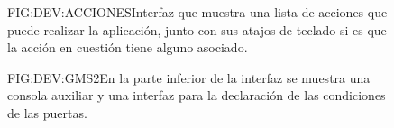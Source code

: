 \begin{figure}{FIG:DEV:ACCIONES}{Interfaz que muestra una lista de acciones que puede realizar la aplicación, junto con sus atajos de teclado si es que la acción en cuestión tiene alguno asociado.}
\end{figure}

\begin{figure}{FIG:DEV:GMS2}{En la parte inferior de la interfaz se muestra una consola auxiliar y una interfaz para la declaración de las condiciones de las puertas.}
 \quad
\end{figure}

\begin{comment}
En esta etapa se han integrado todas las componentes las unas con las otras, dejando componentes vacías que serían sustituídas en la etapa siguiente.

En la interfaz gráfica, se siguieron las maquetas planteadas, dividiendo el área de trabajo en 3 zonas, con tamaños diferentes atendiendo a su función e importancia a la hora de trabajar en el diseño.

Se construyó el sistema de los cambios de contexto mediante el uso de pestañas como elemento gráfico. Los elementos renderizados en el área que se correspondería con el canvas deben gestionar su propia renderización, aunque esta sea dentro de otra componente.

Además de la creación de la propia interfaz gráfica del usuario, se han implementado las acciones generales de la aplicación como el guardar los datos de todos los elementos en un fichero, cargar un diseño desde fichero y la creación de un nuevo diseño sin contenido sobre el que poder trabajar.

Se han proporcionado interfaces de comunicación entre los distintos módulos y componentes gráficas a través del mecanismo de huecos y señales (\textit{slots and signals}) de Qt.

También en esta etapa se ha desarrollado el módulo que se encarga de exportar el diseño al motor \textit{GameMaker Studio 2} para continuar con el desarrollo del juego en esa herramienta.

Finalmente, se han realizado pruebas de consistencia entre las distintas componentes, que involucraban, por ejemplo, que cambios ocasionados en una componente afectaran a otra. Por ejemplo, al eliminar espacio de juego del canvas, si hubiera alguna llave en dicho espacio eliminado, esta tendría que ser eliminada también. Otro ejemplo es que al eliminar un modelo de llave, todas las llaves instanciadas con ese modelo deberían ser eliminadas a su vez.
\end{comment}